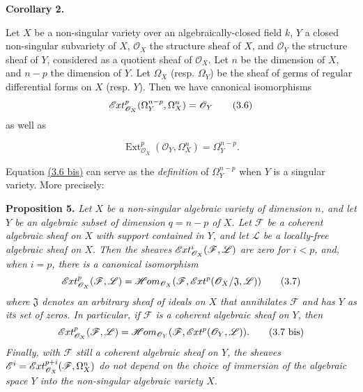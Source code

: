\documentclass{article}
\newenvironment{itenv}[1]
  {\phantomsection\par\smallskip\noindent\textbf{#1.}\itshape}
  {\par\smallskip}
\newenvironment{eqenv}
  {}
  {}
\newcommand{\oldpage}[1]{\marginpar{\footnotesize$\Big\vert$ \textit{p.~#1}}}
\theoremstyle{definition}
\theoremstyle{definition}
\theoremstyle{definition}
\theoremstyle{definition}
\theoremstyle{remark}
\begin{document}
\hypertarget{fga-1-proposition-4-corollary-2}{}
\begin{itenv}{Corollary 2}

Let \(X\) be a non-singular variety over an algebraically-closed field \(k\), \(Y\) a closed non-singular subvariety of \(X\), \({\mathscr{O}}_X\) the structure sheaf of \(X\), and \({\mathscr{O}}_Y\) the structure sheaf of \(Y\), considered as a quotient sheaf of \({\mathscr{O}}_X\).
Let \(n\) be the dimension of \(X\), and \(n-p\) the dimension of \(Y\).
Let \(\Omega_X\) (resp. \(\Omega_Y\)) be the sheaf of germs of regular differential forms on \(X\) (resp. \(Y\)).
Then we have canonical isomorphisms
\[
  \mathscr{E}\kern -.5pt xt_{{\mathscr{O}}_X}^p(\Omega_Y^{n-p},\Omega_X^n) = {\mathscr{O}}_Y
\tag{3.6}
\]
as well as
\oldpage{149-08}

\leavevmode{}%
\begin{eqenv}
\[
  \operatorname{Ext}_{{\mathscr{O}}_X}^p({\mathscr{O}}_Y,\Omega_X^n) = \Omega_Y^{n-p}.
\tag{3.6 bis}
\]

\end{eqenv}

\end{itenv}

Equation \protect\hyperlink{fga-1-equation-3.6bis}{(3.6 bis)} can serve as the \emph{definition} of \(\Omega_Y^{n-p}\) when \(Y\) is a singular variety.
More precisely:

\leavevmode{}%
\begin{itenv}{Proposition 5}
Let \(X\) be a non-singular algebraic variety of dimension \(n\), and let \(Y\) be an algebraic subset of dimension \(q=n-p\) of \(X\).
Let \({\mathscr{F}}\) be a coherent algebraic sheaf on \(X\) with support contained in \(Y\), and let \({\mathscr{L}}\) be a locally-free algebraic sheaf on \(X\).
Then the sheaves \(\mathscr{E}\kern -.5pt xt_{{\mathscr{O}}_X}^i({\mathscr{F}},{\mathscr{L}})\) are zero for \(i<p\), and, when \(i=p\), there is a canonical isomorphism
\[
  \mathscr{E}\kern -.5pt xt_{{\mathscr{O}}_X}^p({\mathscr{F}},{\mathscr{L}}) = \mathscr{H}\kern -.5pt om_{{\mathscr{O}}_X}({\mathscr{F}},\mathscr{E}\kern -.5pt xt^p({\mathscr{O}}_X/{\mathfrak{J}},{\mathscr{L}}))
\tag{3.7}
\]
where \({\mathfrak{J}}\) denotes an arbitrary sheaf of ideals on \(X\) that annihilates \({\mathscr{F}}\) and has \(Y\) as its set of zeros.
In particular, if \({\mathscr{F}}\) is a coherent algebraic sheaf on \(Y\), then
\[
  \mathscr{E}\kern -.5pt xt_{{\mathscr{O}}_X}^p({\mathscr{F}},{\mathscr{L}}) = \mathscr{H}\kern -.5pt om_{{\mathscr{O}}_Y}({\mathscr{F}},\mathscr{E}\kern -.5pt xt^p({\mathscr{O}}_Y,{\mathscr{L}})).
\tag{3.7 bis}
\]
Finally, with \({\mathscr{F}}\) still a coherent algebraic sheaf on \(Y\), the sheaves \({\mathscr{E}}^i=\mathscr{E}\kern -.5pt xt_{{\mathscr{O}}_X}^{p+i}({\mathscr{F}},\Omega_X^n)\) do not depend on the choice of immersion of the algebraic space \(Y\) into the non-singular algebraic variety \(X\).

\end{itenv}
\end{document}
